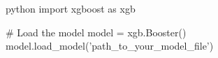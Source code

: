 python
import xgboost as xgb

# Load the model
model = xgb.Booster()
model.load_model('path_to_your_model_file')